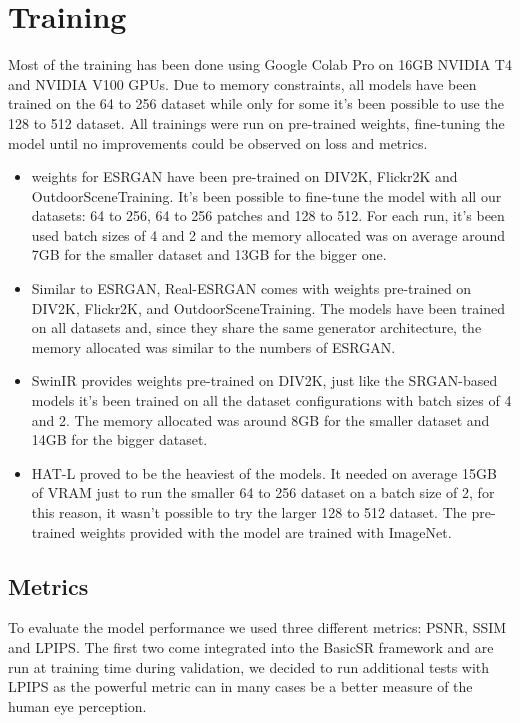 \chapter{Training}
\label{cha:Training}

Most of the training has been done using Google Colab Pro on 16GB NVIDIA T4 and NVIDIA V100 GPUs. Due to memory constraints, all models have been trained on the 64 to 256 dataset while only for some it's been possible to use the 128 to 512 dataset.
All trainings were run on pre-trained weights, fine-tuning the model until no improvements could be observed on loss and metrics.

\begin{itemize}
  \item weights for ESRGAN have been pre-trained on  DIV2K\cite{Agustsson_2017_CVPR_Workshops}, Flickr2K\cite{Lim_2017_CVPR_Workshops} and OutdoorSceneTraining\cite{wang2018recovering}. It's been possible to fine-tune the model with all our datasets: 64 to 256, 64 to 256 patches and 128 to 512. For each run, it's been used batch sizes of 4 and 2 and the memory allocated was on average around 7GB for the smaller dataset and 13GB for the bigger one.
  \item Similar to ESRGAN, Real-ESRGAN comes with weights pre-trained on DIV2K, Flickr2K, and OutdoorSceneTraining. The models have been trained on all datasets and, since they share the same generator architecture, the memory allocated was similar to the numbers of ESRGAN.
  \item SwinIR provides weights pre-trained on DIV2K, just like the SRGAN-based models it's been trained on all the dataset configurations with batch sizes of 4 and 2. The memory allocated was around 8GB for the smaller dataset and 14GB for the bigger dataset.
  \item HAT-L proved to be the heaviest of the models. It needed on average 15GB of VRAM just to run the smaller 64 to 256 dataset on a batch size of 2, for this reason, it wasn't possible to try the larger 128 to 512 dataset. The pre-trained weights provided with the model are trained with ImageNet\cite{deng2009imagenet}.
\end{itemize}

\section{Metrics}
\label{sec:metrics}

To evaluate the model performance we used three different metrics: PSNR, SSIM and LPIPS. The first two come integrated into the BasicSR framework and are run at training time during validation, we decided to run additional tests with LPIPS as the powerful metric can in many cases be a better measure of the human eye perception.


